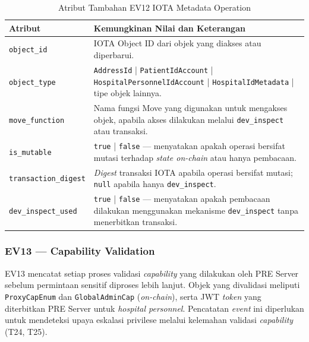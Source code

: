 \begin{table}[htbp]
\centering
\caption{Atribut Tambahan EV12 IOTA Metadata Operation}
\label{tab:ev12-detail}
\renewcommand{\arraystretch}{1.3}
\begin{tabular}{|p{4cm}|p{7.5cm}|}
\hline
\textbf{Atribut} & \textbf{Kemungkinan Nilai dan Keterangan} \\
\hline
\texttt{object\_id} &
IOTA Object ID dari objek yang diakses atau diperbarui. \\
\hline
\texttt{object\_type} &
\texttt{AddressId} | \texttt{PatientIdAccount} |
\texttt{HospitalPersonnelIdAccount} | \texttt{HospitalIdMetadata} |
tipe objek lainnya. \\
\hline
\texttt{move\_function} &
Nama fungsi Move yang digunakan untuk mengakses objek, apabila akses
dilakukan melalui \texttt{dev\_inspect} atau transaksi. \\
\hline
\texttt{is\_mutable} &
\texttt{true} | \texttt{false} --- menyatakan apakah operasi bersifat
mutasi terhadap \textit{state on-chain} atau hanya pembacaan. \\
\hline
\texttt{transaction\_digest} &
\textit{Digest} transaksi IOTA apabila operasi bersifat mutasi;
\texttt{null} apabila hanya \texttt{dev\_inspect}. \\
\hline
\texttt{dev\_inspect\_used} &
\texttt{true} | \texttt{false} --- menyatakan apakah pembacaan dilakukan
menggunakan mekanisme \texttt{dev\_inspect} tanpa menerbitkan transaksi. \\
\hline
\end{tabular}
\end{table}

\subsubsection{EV13 --- Capability Validation}
\label{subsec:ev13-capability-validation}

EV13 mencatat setiap proses validasi \textit{capability} yang dilakukan oleh
PRE Server sebelum permintaan sensitif diproses lebih lanjut. Objek yang
divalidasi meliputi \texttt{ProxyCapEnum} dan \texttt{GlobalAdminCap}
(\textit{on-chain}), serta JWT \textit{token} yang diterbitkan PRE Server untuk
\textit{hospital personnel}. Pencatatan \textit{event} ini diperlukan untuk
mendeteksi upaya eskalasi privilese melalui kelemahan validasi \textit{capability}
(T24, T25).

